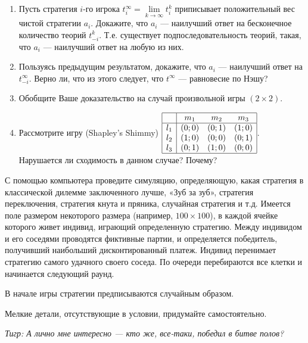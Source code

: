 \begin{problem}
\begin{enumerate}
\item Пусть стратегия  $i$-го игрока  $t_{i}^{\infty } =\mathop{\lim }\limits_{k\to \infty } t_{i}^{k} $  приписывает положительный вес чистой стратегии  $a_{i} $. Докажите, что  $a_{i} $  — наилучший ответ на бесконечное количество теорий  $t_{-i}^{k} $. Т.е. существует подпоследовательность теорий, такая, что  $a_{i} $  — наилучший ответ на любую из них.\par
\item Пользуясь предыдущим результатом, докажите, что  $a_{i} $  — наилучший ответ на  $t_{-i}^{\infty } $. Верно ли, что из этого следует, что  $t^{\infty}$  — равновесие по Нэшу?\par
\item Обобщите Ваше доказательство на случай произвольной игры  $\left(2\times 2\right)$.\par
\item Рассмотрите игру (Shapley's Shimmy)  $\begin{array}{|c|ccc|}  \hline {} & {m_{1} } & {m_{2} } & {m_{3} } \\  \hline {l_{1} } & {\left(0;0\right)} & {\left(0;1\right)} & {\left(1;0\right)} \\ {l_{2} } & {\left(1;0\right)} & {\left(0;0\right)} & {\left(0;1\right)} \\ {l_{3} } & {\left(0;1\right)} & {\left(1;0\right)} & {\left(0;0\right)} \\  \hline  \end{array}$. Нарушается ли сходимость в данном случае? Почему?
\end{enumerate}


\begin{sol} \end{sol}
\end{problem}



\begin{problem}
С помощью компьютера проведите симуляцию, определяющую, какая стратегия в классической дилемме заключенного лучше, «Зуб за зуб», стратегия переключения, стратегия кнута и пряника, случайная стратегия и т.д.
Имеется поле размером некоторого размера (например,  $100\times 100$), в каждой ячейке которого живет индивид, играющий определенную стратегию.
Между индивидом и его соседями проводятся фиктивные партии, и определяется победитель, получивший наибольший дисконтированный платеж. Индивид перенимает стратегию самого удачного своего соседа. По очереди перебираются все клетки и начинается следующий раунд.\par
В начале игры стратегии предписываются случайным образом.\par
Мелкие детали, отсутствующие в условии, придумайте самостоятельно.\par
{\it Тигр: А лично мне интересно — кто же, все-таки, победил в битве полов? }
\begin{sol} \end{sol}
\end{problem}



